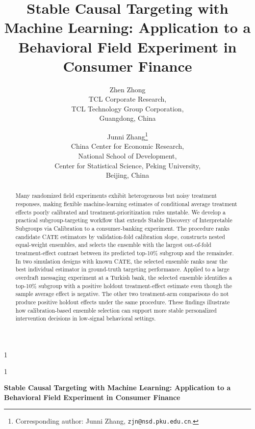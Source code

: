\documentclass[12pt]{article}
\newcommand{\blind}{1}
\newcommand{\TargetFrac}{10{\%}\xspace}
\begin{document}
\def\spacingset#1{\renewcommand{\baselinestretch}{#1}\small\normalsize}
\spacingset{1}

\blind
{
  \title{\bf Stable Causal Targeting with Machine Learning: Application to a Behavioral Field Experiment in Consumer Finance}
  \author{Zhen Zhong\\
  TCL Corporate Research,\\
  TCL Technology Group Corporation,\\
  Guangdong, China
  \and
  Junni Zhang\thanks{Corresponding author: Junni Zhang, \texttt{zjn@nsd.pku.edu.cn}.}\\
  China Center for Economic Research,\\
  National School of Development,\\
  Center for Statistical Science, Peking University,\\
  Beijing, China}
  \maketitle
} \fi

\blind
{
  \bigskip
  \bigskip
  \bigskip
  \begin{center}
    {\LARGE\bf Stable Causal Targeting with Machine Learning: Application to a Behavioral Field Experiment in Consumer Finance}
  \end{center}
  \medskip
} \fi

\bigskip
\begin{abstract}
Many randomized field experiments exhibit heterogeneous but noisy treatment responses, making flexible machine-learning estimates of conditional average treatment effects poorly calibrated and treatment-prioritization rules unstable. We develop a practical subgroup-targeting workflow that extends Stable Discovery of Interpretable Subgroups via Calibration to a consumer-banking experiment. The procedure ranks candidate CATE estimators by validation-fold calibration slope, constructs nested equal-weight ensembles, and selects the ensemble with the largest out-of-fold treatment-effect contrast between its predicted top-\TargetFrac subgroup and the remainder. In two simulation designs with known CATE, the selected ensemble ranks near the best individual estimator in ground-truth targeting performance. Applied to a large overdraft messaging experiment at a Turkish bank, the selected ensemble identifies a top-\TargetFrac subgroup with a positive holdout treatment-effect estimate even though the sample average effect is negative. The other two treatment-arm comparisons do not produce positive holdout effects under the same procedure. These findings illustrate how calibration-based ensemble selection can support more stable personalized intervention decisions in low-signal behavioral settings.
\end{abstract}
\end{document}
